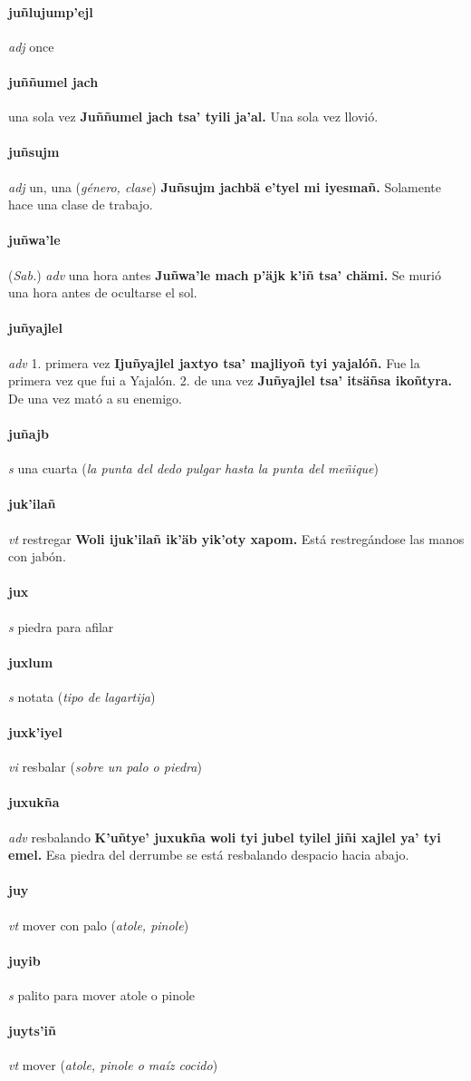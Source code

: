 \documentclass{scrbook}
\newcommand{\entry}[1]{\paragraph{#1}}
\newcommand{\onedefinition}[1]{#1.}
\newcommand{\partofspeech}[1]{\textit{#1}}
\newcommand{\spanishtranslation}[1]{#1}
\newcommand{\clarification}[1]{(\textit{#1})}
\newcommand{\cholexample}[1]{\textbf{#1}}
\newcommand{\exampletranslation}[1]{#1}
\newcommand{\relevantdialect}[1]{(\textit{#1})}
\begin{document}
\begin{multicols}{2}
\entry{juñlujump'ejl}
\partofspeech{adj}
\spanishtranslation{once}

\entry{juññumel jach}
\spanishtranslation{una sola vez}
\cholexample{Juññumel jach tsa' tyili ja'al.}
\exampletranslation{Una sola vez llovió.}

\entry{juñsujm}
\partofspeech{adj}
\spanishtranslation{un, una}
\clarification{género, clase}
\cholexample{Juñsujm jachbä e'tyel mi iyesmañ.}
\exampletranslation{Solamente hace una clase de trabajo.}

\entry{juñwa'le}
\relevantdialect{Sab.}
\partofspeech{adv}
\spanishtranslation{una hora antes}
\cholexample{Juñwa'le mach p'äjk k'iñ tsa' chämi.}
\exampletranslation{Se murió una hora antes de ocultarse el sol.}

\entry{juñyajlel}
\partofspeech{adv}
\onedefinition{1}
\spanishtranslation{primera vez}
\cholexample{Ijuñyajlel jaxtyo tsa' majliyoñ tyi yajalóñ.}
\exampletranslation{Fue la primera vez que fui a Yajalón.}
\onedefinition{2}
\spanishtranslation{de una vez}
\cholexample{Juñyajlel tsa' itsäñsa ikoñtyra.}
\exampletranslation{De una vez mató a su enemigo.}

\entry{juñajb}
\partofspeech{s}
\spanishtranslation{una cuarta}
\clarification{la punta del dedo pulgar hasta la punta del meñique}

\entry{juk'ilañ}
\partofspeech{vt}
\spanishtranslation{restregar}
\cholexample{Woli ijuk'ilañ ik'äb yik'oty xapom.}
\exampletranslation{Está restregándose las manos con jabón.}

\entry{jux}
\partofspeech{s}
\spanishtranslation{piedra para afilar}

\entry{juxlum}
\partofspeech{s}
\spanishtranslation{notata}
\clarification{tipo de lagartija}

\entry{juxk'iyel}
\partofspeech{vi}
\spanishtranslation{resbalar}
\clarification{sobre un palo o piedra}

\entry{juxukña}
\partofspeech{adv}
\spanishtranslation{resbalando}
\cholexample{K'uñtye' juxukña woli tyi jubel tyilel jiñi xajlel ya' tyi emel.}
\exampletranslation{Esa piedra del derrumbe se está resbalando despacio hacia abajo.}

\entry{juy}
\partofspeech{vt}
\spanishtranslation{mover con palo}
\clarification{atole, pinole}

\entry{juyib}
\partofspeech{s}
\spanishtranslation{palito para mover atole o pinole}

\entry{juyts'iñ}
\partofspeech{vt}
\spanishtranslation{mover}
\clarification{atole, pinole o maíz cocido}


\end{multicols}
\end{document}
